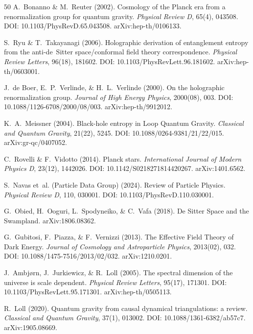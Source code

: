 \documentclass[aps,prd,twocolumn,superscriptaddress,nofootinbib]{revtex4-2}
\begin{document}
\begin{thebibliography}{50}
A.~Bonanno \& M.~Reuter (2002).
Cosmology of the Planck era from a renormalization group for quantum gravity.
\textit{Physical Review D}, 65(4), 043508.
DOI: 10.1103/PhysRevD.65.043508.
arXiv:hep-th/0106133.

S.~Ryu \& T.~Takayanagi (2006).
Holographic derivation of entanglement entropy from the anti-de~Sitter space/conformal field theory correspondence.
\textit{Physical Review Letters}, 96(18), 181602.
DOI: 10.1103/PhysRevLett.96.181602.
arXiv:hep-th/0603001.

J.~de Boer, E.~P.~Verlinde, \& H.~L.~Verlinde (2000).
On the holographic renormalization group.
\textit{Journal of High Energy Physics}, 2000(08), 003.
DOI: 10.1088/1126-6708/2000/08/003.
arXiv:hep-th/9912012.


K.~A.~Meissner (2004).
Black-hole entropy in Loop Quantum Gravity.
\textit{Classical and Quantum Gravity}, 21(22), 5245.
DOI: 10.1088/0264-9381/21/22/015.
arXiv:gr-qc/0407052.

C.~Rovelli \& F.~Vidotto (2014).
Planck stars.
\textit{International Journal of Modern Physics D}, 23(12), 1442026.
DOI: 10.1142/S0218271814420267.
arXiv:1401.6562.

S.~Navas et~al. (Particle Data Group) (2024).
Review of Particle Physics.
\textit{Physical Review D}, 110, 030001.
DOI: 10.1103/PhysRevD.110.030001.

G.~Obied, H.~Ooguri, L.~Spodyneiko, \& C.~Vafa (2018).
De Sitter Space and the Swampland.
arXiv:1806.08362.

G.~Gubitosi, F.~Piazza, \& F.~Vernizzi (2013).
The Effective Field Theory of Dark Energy.
\textit{Journal of Cosmology and Astroparticle Physics}, 2013(02), 032.
DOI: 10.1088/1475-7516/2013/02/032.
arXiv:1210.0201.

J.~Ambj\o{}rn, J.~Jurkiewicz, \& R.~Loll (2005).
The spectral dimension of the universe is scale dependent.
\textit{Physical Review Letters}, 95(17), 171301.
DOI: 10.1103/PhysRevLett.95.171301.
arXiv:hep-th/0505113.

R.~Loll (2020).
Quantum gravity from causal dynamical triangulations: a review.
\textit{Classical and Quantum Gravity}, 37(1), 013002.
DOI: 10.1088/1361-6382/ab57c7.
arXiv:1905.08669.

\end{thebibliography}
\end{document}

